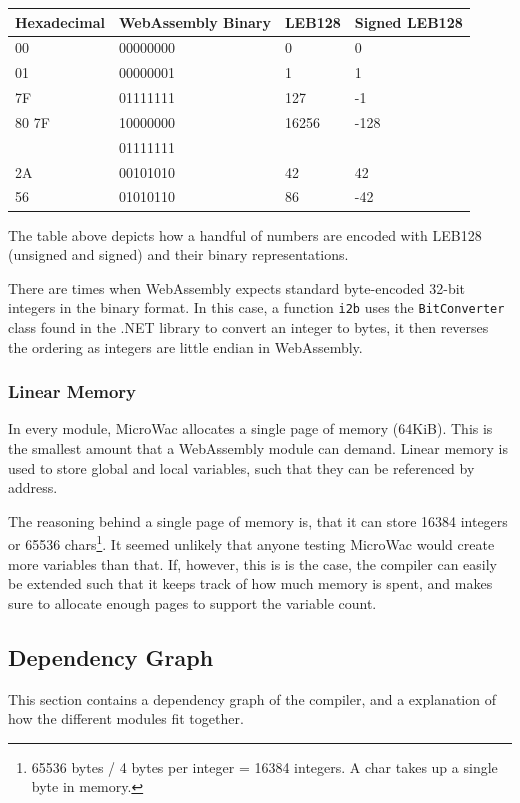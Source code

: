 \documentclass[a4paper]{article}
\begin{document}
\begin{center}
    \begin{tabular}{| l | l | l | l |}
    \hline
    Hexadecimal & WebAssembly Binary & LEB128 & Signed LEB128 \\ \hline
    00    & 00000000 &     0 &    0 \\ \hline
    01    & 00000001 &     1 &    1 \\ \hline
    7F    & 01111111 &   127 &   -1 \\ \hline
    80 7F & 10000000 & 16256 & -128 \\
          & 01111111 & &            \\ \hline
    2A    & 00101010 &    42 &   42 \\ \hline
    56    & 01010110 &    86 &  -42 \\ \hline
    \end{tabular}
\end{center}

The table above depicts how a handful of numbers are encoded with LEB128 (unsigned and signed) and their binary representations.

There are times when WebAssembly expects standard byte-encoded 32-bit integers in the binary format. In this case, a function \texttt{i2b} uses the \texttt{BitConverter} class found in the .NET library to convert an integer to bytes, it then reverses the ordering as integers are little endian in WebAssembly.

\subsubsection{Linear Memory}
\label{sec:technical:webassembly:memory}
In every module, MicroWac allocates a single page of memory (64KiB). This is the smallest amount that a WebAssembly module can demand. Linear memory is used to store global and local variables, such that they can be referenced by address.

The reasoning behind a single page of memory is, that it can store 16384 integers or 65536 chars\footnote{65536 bytes / 4 bytes per integer = 16384 integers. A char takes up a single byte in memory.}. It seemed unlikely that anyone testing MicroWac would create more variables than that. If, however, this is is the case, the compiler can easily be extended such that it keeps track of how much memory is spent, and makes sure to allocate enough pages to support the variable count.

\subsection{Dependency Graph}
\label{sec:technical:dependency-graph}
This section contains a dependency graph of the compiler, and a explanation of how the different modules fit together.
\end{document}
